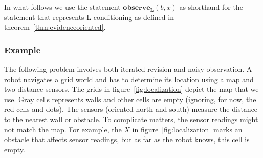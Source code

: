 \documentclass{llncs}
\newcommand{\Rank}[1]{\hspace{3pt} \pmb{\langle} #1 \pmb{\rangle}\hspace{3pt} } %
\begin{document}
In what follows we use the statement $\textbf{observe}_{\textbf{L}}(b, x)$ as shorthand for the statement that represents L-conditioning as defined in theorem~\ref{thm:evidenceoriented}.

\subsubsection{Example}

The following problem involves both iterated revision and noisy observation.
A robot navigates a grid world and has to determine its location using a map and two distance sensors.
The grids in figure~\ref{fig:localization} depict the map that we use.
Gray cells represents walls and other cells are empty (ignoring, for now, the red cells and dots).
The sensors (oriented north and south) measure the distance to the nearest wall or obstacle.
To complicate matters, the sensor readings might not match the map.
For example, the $X$ in figure~\ref{fig:localization} marks an obstacle that affects sensor readings, but as far as the robot knows, this cell is empty.
\end{document}
